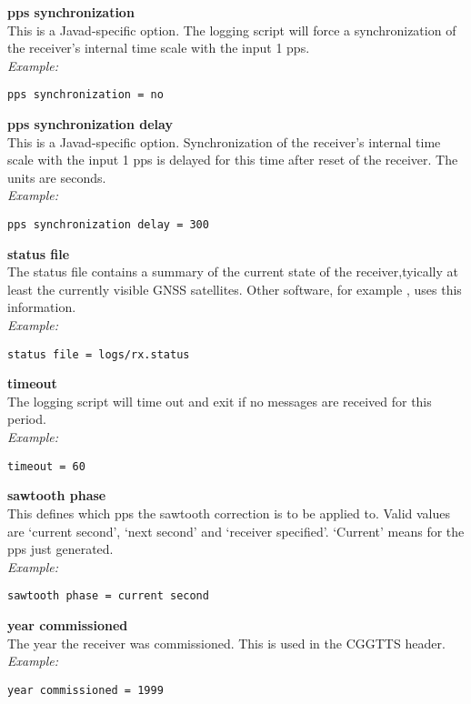 {\bfseries pps synchronization}\\ \hypertarget{h:pps_synchronization}{}
This is a Javad-specific option. The logging script will force a synchronization of the receiver's
internal time scale with the input 1 pps.\\
\textit{Example:}
\begin{lstlisting}
pps synchronization = no
\end{lstlisting}

{\bfseries pps synchronization delay}\\ \hypertarget{h:pps_synchronization_delay}{}
This is a Javad-specific option. Synchronization of the receiver's
internal time scale with the input 1 pps is delayed for this time after reset of the receiver.
The units are seconds.\\
\textit{Example:}
\begin{lstlisting}
pps synchronization delay = 300
\end{lstlisting}

{\bfseries status file}\\
The status file contains a summary of the current state of the receiver,tyically at least the
currently visible GNSS satellites. Other software, for example , uses this information.\\
\textit{Example:}
\begin{lstlisting}
status file = logs/rx.status
\end{lstlisting}

{\bfseries timeout}\\
The logging script will time out and exit if no messages are received for this period.\\
\textit{Example:}
\begin{lstlisting}
timeout = 60
\end{lstlisting}

{\bfseries sawtooth phase}\\
This defines which pps the sawtooth correction is to be applied to.
Valid values are `current second', `next second' and `receiver specified'.
`Current' means for the pps just generated.\\
\textit{Example:}
\begin{lstlisting}
sawtooth phase = current second
\end{lstlisting}

{\bfseries year commissioned}\\
The year the receiver was commissioned. This is used in the CGGTTS header.\\
\textit{Example:}
\begin{lstlisting}
year commissioned = 1999
\end{lstlisting}

